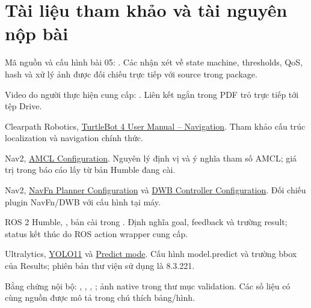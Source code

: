 \section*{Tài liệu tham khảo và tài nguyên nộp bài}
\begin{enumerate}[label={[\arabic*]}]
\item Mã nguồn và cấu hình bài 05: \ghlink{}. Các nhận xét về state machine, thresholds, QoS, hash và xử lý ảnh được đối chiếu trực tiếp với source trong package.
\item Video do người thực hiện cung cấp: \vidlink{}. Liên kết ngắn trong PDF trỏ trực tiếp tới tệp Drive.
\item Clearpath Robotics, \href{https://turtlebot.github.io/turtlebot4-user-manual/tutorials/navigation.html}{TurtleBot 4 User Manual -- Navigation}. Tham khảo cấu trúc localization và navigation chính thức.
\item Nav2, \href{https://github.com/ros-navigation/navigation2/tree/humble/nav2_amcl}{AMCL Configuration}. Nguyên lý định vị và ý nghĩa tham số AMCL; giá trị trong báo cáo lấy từ bản Humble đang cài.
\item Nav2, \href{https://github.com/ros-navigation/navigation2/tree/humble/nav2_navfn_planner}{NavFn Planner Configuration} và \href{https://github.com/ros-navigation/navigation2/tree/humble/nav2_dwb_controller}{DWB Controller Configuration}. Đối chiếu plugin NavFn/DWB với cấu hình tại máy.
\item ROS 2 Humble, , bản cài trong . Định nghĩa goal, feedback và trường result; status kết thúc do ROS action wrapper cung cấp.
\item Ultralytics, \href{https://docs.ultralytics.com/models/yolo11/}{YOLO11} và \href{https://docs.ultralytics.com/modes/predict/}{Predict mode}. Cấu hình model.predict và trường bbox của Results; phiên bản thư viện sử dụng là 8.3.221.
\item Bằng chứng nội bộ: , , , ; ảnh native trong thư mục validation. Các số liệu có cùng nguồn được mô tả trong chú thích bảng/hình.
\end{enumerate}
